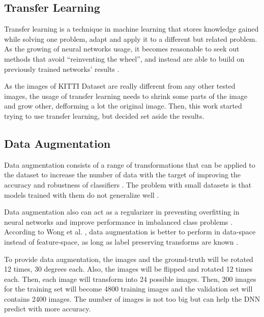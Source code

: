 \documentclass[10pt,twocolumn,letterpaper]{article}
\begin{document}
\subsection{Transfer Learning} \label{ssec:transfer_learning}

Transfer learning is a technique in machine learning that stores knowledge gained while solving one problem, adapt and apply it to a different but related problem. As the growing of neural networks usage, it becomes reasonable to seek out methods that avoid ``reinventing the wheel'', and instead are able to build on previously trained networks' results \cite{PRATT} \cite{WEISS2016}.

As the images of KITTI Dataset are really different from any other tested images, the usage of transfer learning needs to shrink some parts of the image and grow other, defforming a lot the original image. Then, this work started trying to use transfer learning, but decided set aside the results.

\subsection{Data Augmentation} \label{ssec:data_augmentation}

Data augmentation consists of a range of transformations that can be applied to the dataset to increase the number of data with the target of improving the accuracy and robustness of classifiers \cite{AUGM_ADAPT}. The problem with small datasets is that models trained with them do not generalize well \cite{AUGM_DEEP}.

Data augmentation also can act as a regularizer in preventing overfitting in neural networks and improve performance in imbalanced class problems \cite{DATA_AUGM}. According to Wong et al. \cite{DATA_AUGM}, data augmentation is better to perform in data-space instead of feature-space, as long as label preserving transforms are known \cite{DATA_AUGM}.

To provide data augmentation, the images and the ground-truth will be rotated 12 times, 30 degrees each. Also, the images will be flipped and rotated 12 times each. Then, each image will transform into 24 possible images. Then, 200 images for the training set will become 4800 training images and the validation set will contains 2400 images. The number of images is not too big but can help the DNN predict with more accuracy.
\end{document}
